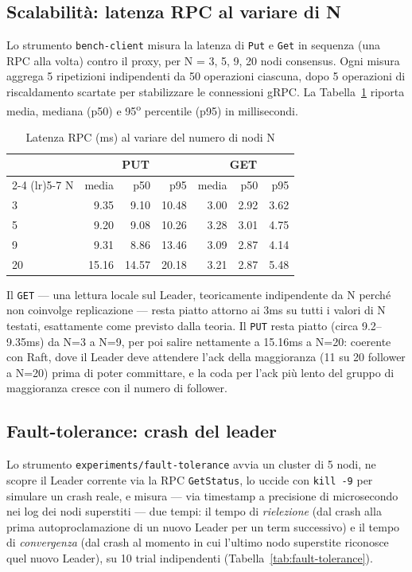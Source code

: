 \documentclass[conference]{IEEEtran}
\begin{document}
\subsection{Scalabilità: latenza RPC al variare di N}

Lo strumento \texttt{bench-client} misura la latenza di \texttt{Put} e
\texttt{Get} in sequenza (una RPC alla volta) contro il proxy, per N =
3, 5, 9, 20 nodi consensus. Ogni misura aggrega 5 ripetizioni indipendenti
da 50 operazioni ciascuna, dopo 5 operazioni di riscaldamento scartate per
stabilizzare le connessioni gRPC. La Tabella~\ref{tab:scalability} riporta
media, mediana (p50) e 95\textsuperscript{o} percentile (p95) in
millisecondi.

\begin{table}[H]
\centering
\caption{Latenza RPC (ms) al variare del numero di nodi N}
\label{tab:scalability}
\begin{tabular}{@{}lrrrrrr@{}}
\toprule
 & \multicolumn{3}{c}{PUT} & \multicolumn{3}{c}{GET} \\
\cmidrule(lr){2-4} \cmidrule(lr){5-7}
N & media & p50 & p95 & media & p50 & p95 \\
\midrule
3  & 9.35  & 9.10  & 10.48 & 3.00 & 2.92 & 3.62 \\
5  & 9.20  & 9.08  & 10.26 & 3.28 & 3.01 & 4.75 \\
9  & 9.31  & 8.86  & 13.46 & 3.09 & 2.87 & 4.14 \\
20 & 15.16 & 14.57 & 20.18 & 3.21 & 2.87 & 5.48 \\
\bottomrule
\end{tabular}
\end{table}

Il \texttt{GET} — una lettura locale sul Leader, teoricamente indipendente
da N perché non coinvolge replicazione — resta piatto attorno ai 3ms su
tutti i valori di N testati, esattamente come previsto dalla teoria. Il
\texttt{PUT} resta piatto (circa 9.2--9.35ms) da N=3 a N=9, per poi salire
nettamente a 15.16ms a N=20: coerente con Raft, dove il Leader deve
attendere l'ack della maggioranza (11 su 20 follower a N=20) prima di
poter committare, e la coda per l'ack più lento del gruppo di maggioranza
cresce con il numero di follower.

\subsection{Fault-tolerance: crash del leader}

Lo strumento \texttt{experiments/fault-tolerance} avvia un cluster di 5
nodi, ne scopre il Leader corrente via la RPC \texttt{GetStatus}, lo
uccide con \texttt{kill -9} per simulare un crash reale, e misura — via
timestamp a precisione di microsecondo nei log dei nodi superstiti — due
tempi: il tempo di \emph{rielezione} (dal crash alla prima
autoproclamazione di un nuovo Leader per un term successivo) e il tempo di
\emph{convergenza} (dal crash al momento in cui l'ultimo nodo superstite
riconosce quel nuovo Leader), su 10 trial indipendenti (Tabella~\ref{tab:fault-tolerance}).
\end{document}

